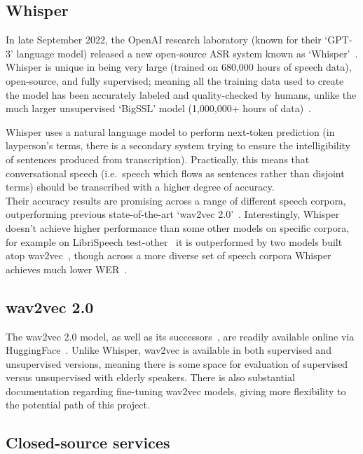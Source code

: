 \subsection{Whisper}\label{subsec:whisper}

In late September 2022, the OpenAI research laboratory (known for their `GPT-3' language model)
released a new open-source ASR system known as `Whisper'~\cite{whisper}.
Whisper is unique in being very large (trained on 680,000 hours of speech data), open-source, and
fully supervised;
meaning all the training data used to create the model has been accurately labeled and
quality-checked by humans, unlike the much larger unsupervised `BigSSL' model (1,000,000+ hours
of data)~\cite{bigssl}.

Whisper uses a natural language model to perform next-token prediction (in layperson's
terms, there is a secondary system trying to ensure the intelligibility of sentences produced
from transcription).
Practically, this means that conversational speech (i.e.\ speech which flows as sentences rather
than disjoint terms) should be transcribed with a higher degree of accuracy.\\

Their accuracy results are promising across a range of different speech corpora, outperforming
previous state-of-the-art `wav2vec 2.0'~\cite{wav2vec}.
Interestingly, Whisper doesn't achieve higher performance than some other models on specific
corpora, for example on LibriSpeech test-other~\cite{librispeech} it is outperformed by
two models built atop wav2vec~\cite{zhang2020,chung2021}, though across a more diverse set
of speech corpora Whisper achieves much lower WER~\cite{whisper}.

\subsection{wav2vec 2.0}\label{subsec:wav2vec}

The wav2vec 2.0 model, as well as its successors~\cite{wav2vec, chung2021, zhang2020}, are
readily available online via HuggingFace~\cite{huggingfacetransformers}.
Unlike Whisper, wav2vec is available in both supervised and unsupervised versions, meaning there
is some space for evaluation of supervised versus unsupervised with elderly speakers.
There is also substantial documentation regarding fine-tuning wav2vec models, giving more
flexibility to the potential path of this project.

\subsection{Closed-source services}\label{subsec:closed-source-services}

